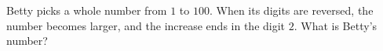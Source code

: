 Betty picks a whole number from $1$ to $100$. When its digits are reversed, the number becomes larger, and the increase ends in the digit $2$. What is Betty's number?

